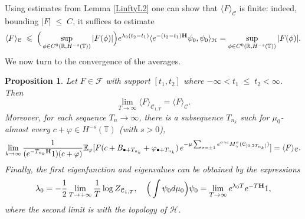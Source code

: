 \documentclass[11pt]{amsart}
\numberwithin{equation}{section}
\newtheorem{proposition}[theorem]{Proposition}
\theoremstyle{definition}
\renewcommand{\leq}{\;\leqslant\;}                   %
\newcommand{\R}{\mathbb{R}}
\newcommand{\cjd}{\rangle}
\newcommand{\cjg}{\langle}
\def\E{\mathbb{E}}
\newcommand{\mc}{\mathcal}
\newcommand{\la}{\lambda}
\def\T{\mathbb{T}}
\begin{document}
Using estimates from Lemma \ref{LinftyL2} one can show that $\cjg F\cjd_{\mc{C}}$ is finite: indeed, bounding $|F|\leq C$, it suffices to estimate 
\begin{equation}\label{bound_EF}
 \cjg F\cjd_{\mc{C}} \leq  \Big(\sup_{\phi\in C^0(\R,H^{-s}(\T))}|F(\phi)|\Big)e^{\lambda_0(t_2-t_1)}\cjg e^{-(t_2-t_1){\bf H}}\psi_0,\psi_0\cjd_{\mc{H}}=\sup_{\phi\in C^0(\R,H^{-s}(\T))}|F(\phi)|. 
 \end{equation}
We now turn to the convergence of the averages.

\begin{proposition} \label{prop: sinh expectation}
Let $F \in \mathcal{F}$ with support $[t_1,t_2]$ where $-\infty < t_1 \leq t_2 < \infty$. Then 
\[\lim_{T\to \infty} \langle F \rangle_{\mc{C}_{1,T}}
=\cjg F\cjd_{\mc{C}}.\]
Moreover,  for each sequence $T_n\to \infty$, there is a subsequence $T_{n_k}$ such for $\mu_0$-almost every $c+\varphi\in H^{-s}(\T)$ (with $s>0$),
\begin{equation}\label{ae_convergence}
\lim_{k\to \infty} \frac{1}{(e^{-T_{n_k}{\bf H}}1)(c+\varphi)}  \E_\varphi[F (c+B_{\bullet+T_{n_k}}+\varphi_{\bullet+T_{n_k}}) \,   e^{- \mu\sum_{\sigma = \pm 1} 
e^{\sigma\gamma c} M_\gamma^\sigma(\mc{C}_{[0,2T_{n_k}]})}]
=\cjg F\cjd_{\mc{C}}.	
\end{equation}
Finally, the first eigenfunction and eigenvalues can be obtained by the expressions 
\[ \la_0=-\frac{1}{2}\lim_{T\to +\infty}\frac{1}{T}\log Z_{\mc{C}_{1,T}}, \quad \Big(\int \psi_0d\mu_0\Big) \psi_0= \lim_{T\to \infty}e^{\la_0T}e^{-T{\bf H}}1,\]
where the second limit is with the topology of $\mc{H}$.
\end{proposition}
\end{document}
